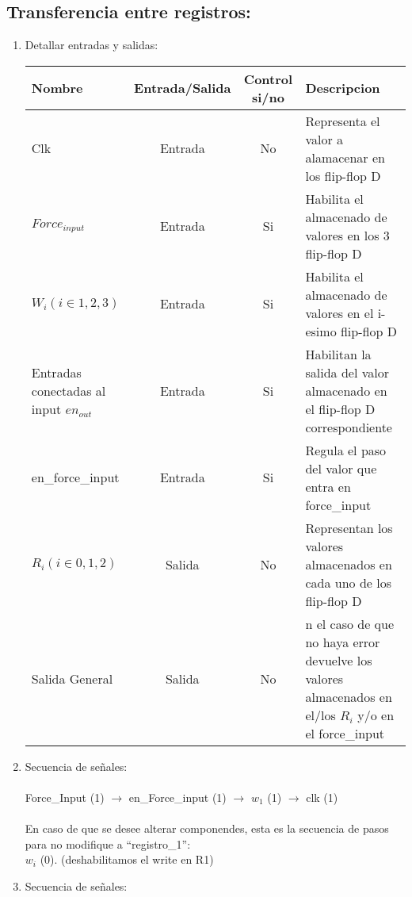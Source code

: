 \documentclass{article}
\begin{document}
\subsection{\textbf{Transferencia entre registros:}}
\begin{enumerate}
    \item Detallar entradas y salidas:
    \begin{center}{\renewcommand{\arraystretch}{1.5}
        \begin{tabular}{p{3.5cm} | c | c |p{9cm} }
            Nombre &Entrada/Salida & Control si/no & Descripcion \\ \hline
            Clk & Entrada & No & Representa el valor a alamacenar en los flip-flop D\\
            $Force_{input}$ & Entrada & Si & Habilita el almacenado de valores en los 3 flip-flop D\\
            $W_i (i\in 1,2,3)$ & Entrada & Si & Habilita el almacenado de valores en el i-esimo flip-flop D\\
            Entradas conectadas al input $en_{out}$ & Entrada & Si & Habilitan la salida del valor almacenado en el flip-flop D correspondiente\\
            en\_force\_input & Entrada & Si & Regula el paso del valor que entra en force\_input \\
            $R_i (i\in 0,1,2)$ & Salida & No & Representan los valores almacenados en cada uno de los flip-flop D\\
            Salida General & Salida & No & n el caso de que no haya error devuelve los valores almacenados en el/los $R_i$ y/o en el force\_input\\
        \end{tabular}}
    \end{center}
    \item Secuencia de señales:\\\\
    Force\_Input (1) $\rightarrow$ en\_Force\_input (1) $\rightarrow$  $w_1$ (1) $\rightarrow$ clk (1)\\\\

    En caso de que se desee alterar componendes, esta es la secuencia de pasos para no modifique a “registro\_1”:\\
    $w_i$ (0). (deshabilitamos el write en R1)

    \item Secuencia de señales:\\\\
    

\end{enumerate}
\end{document}
